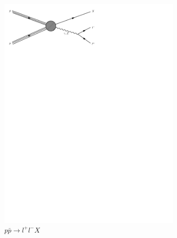 \begin{figure}[h]
\begin{subfigure}[b]{0.3\textwidth}
    \includegraphics[trim={0.5cm 22cm 10cm 0cm},width=\textwidth]{../Diagrams/D4.pdf}
    \caption{$p\bar{p}\rightarrow l^+l^-X$}
    \label{fey:4}
  \end{subfigure}%
  ~
  \begin{subfigure}[b]{0.3\textwidth}

\end{subfigure}
\end{figure}
